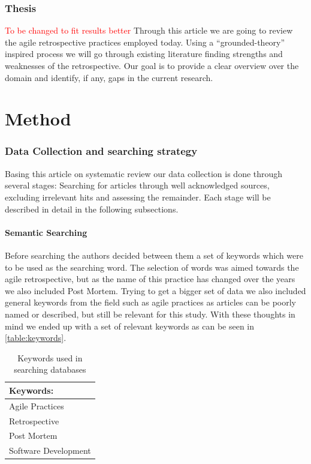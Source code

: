 \documentclass[12pt]{article}
\newcommand\todo[1]{\textcolor{red}{#1}}
\begin{document}
\section{Thesis}
\todo{To be changed to fit results better}
Through this article we are going to review the agile retrospective practices employed today. Using a ``grounded-theory'' inspired process we will go through existing literature finding strengths and weaknesses of the retrospective. Our goal is to provide a clear overview over the domain and identify, if any, gaps in the current research. 

\clearpage

\part{Method}

\section{Data Collection and searching strategy}
Basing this article on systematic review our data collection is done through several stages: Searching for articles through well acknowledged sources, excluding irrelevant hits and assessing the remainder. Each stage will be described in detail in the following subsections.

\subsection{Semantic Searching}
Before searching the authors decided between them a set of keywords which were to be used as the searching word. The selection of words was aimed towards the agile retrospective, but as the name of this practice has changed over the years we also included Post Mortem. Trying to get a bigger set of data we also included general keywords from the field such as agile practices as articles can be poorly named or described, but still be relevant for this study. With these thoughts in mind we ended up with a set of relevant keywords as can be seen in \autoref{table:keywords}.

\begin{table}[!h]
	\begin{center}
		\caption{Keywords used in searching databases}
		\label{table:keywords}
		\begin{tabular}{ l }
			Keywords: \\ \hline
			Agile Practices \\
			Retrospective \\
			Post Mortem \\
			Software Development \\
		\end{tabular}
	\end{center}
\end{table}
\end{document}
